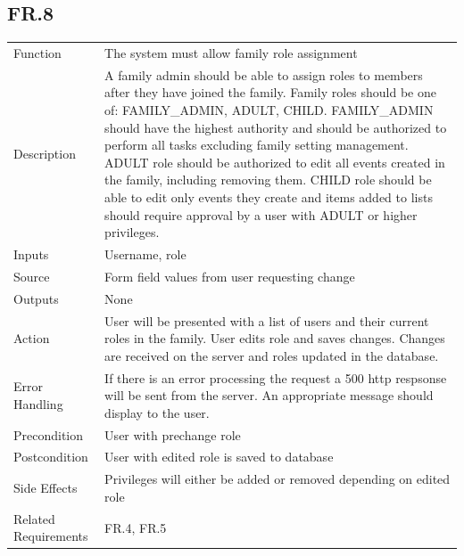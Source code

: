 \documentclass[12pt]{article}
\begin{document}
    \subsection*{FR.8}
    \begin{center}
        \begin{tabular}{| p{10em} p{26em} |}
        \hline
         Function & The system must allow family role assignment\\
         Description & A family admin should be able to assign roles to members after they have joined the family. Family roles should be one of: FAMILY\_ADMIN, ADULT, CHILD. FAMILY\_ADMIN should have the highest authority and should be authorized to perform all tasks excluding family setting management. ADULT role should be authorized to edit all events created in the family, including removing them. CHILD role should be able to edit only events they create and items added to lists should require approval by a user with ADULT or higher privileges.\\
         Inputs & Username, role\\
         Source & Form field values from user requesting change\\
         Outputs & None\\
         Action & User will be presented with a list of users and their current roles in the family. User edits role and saves changes. Changes are received on the server and roles updated in the database.\\
         Error Handling & If there is an error processing the request a 500 http respsonse will be sent from the server. An appropriate message should display to the user.\\
         Precondition & User with prechange role\\
         Postcondition & User with edited role is saved to database\\
         Side Effects & Privileges will either be added or removed depending on edited role\\
         Related Requirements & FR.4, FR.5\\
         \hline
        \end{tabular}
    \end{center}
\end{document}
